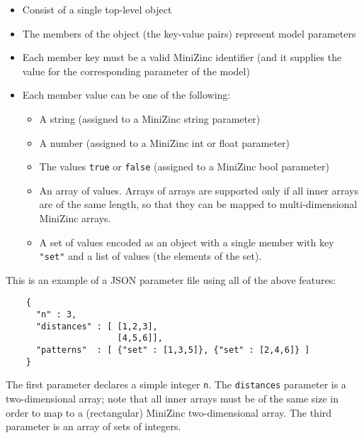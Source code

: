 \documentclass[10pt]{scrartcl}
\begin{document}
\begin{itemize}
  \item Consist of a single top-level object
  \item The members of the object (the key-value pairs) represent model parameters
  \item Each member key must be a valid MiniZinc identifier (and it supplies the value for the corresponding parameter of the model)
  \item Each member value can be one of the following:
  \begin{itemize}
    \item A string (assigned to a MiniZinc string parameter)
    \item A number (assigned to a MiniZinc int or float parameter)
    \item The values \texttt{true} or \texttt{false} (assigned to a MiniZinc bool parameter)
    \item An array of values. Arrays of arrays are supported only if all inner arrays are of the same length, so that they can be mapped to multi-dimensional MiniZinc arrays.
    \item A set of values encoded as an object with a single member with key \verb|"set"| and a list of values (the elements of the set).
  \end{itemize}
\end{itemize}

This is an example of a JSON parameter file using all of the above features:

\begin{verbatim}
    {
      "n" : 3,
      "distances" : [ [1,2,3],
                      [4,5,6]],
      "patterns"  : [ {"set" : [1,3,5]}, {"set" : [2,4,6]} ]
    }
\end{verbatim}

The first parameter declares a simple integer \texttt{n}. The \texttt{distances} parameter is a two-dimensional array; note that all inner arrays must be of the same size in order to map to a (rectangular) MiniZinc two-dimensional array. The third parameter is an array of sets of integers.
\end{document}
